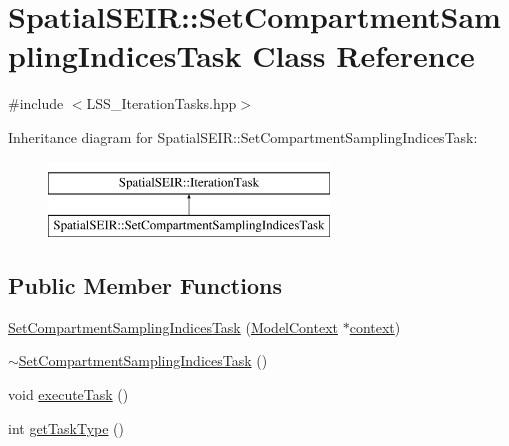 \hypertarget{classSpatialSEIR_1_1SetCompartmentSamplingIndicesTask}{\section{Spatial\-S\-E\-I\-R\-:\-:Set\-Compartment\-Sampling\-Indices\-Task Class Reference}
\label{classSpatialSEIR_1_1SetCompartmentSamplingIndicesTask}
}


{\ttfamily \#include $<$L\-S\-S\-\_\-\-Iteration\-Tasks.\-hpp$>$}

Inheritance diagram for Spatial\-S\-E\-I\-R\-:\-:Set\-Compartment\-Sampling\-Indices\-Task\-:\begin{figure}[H]
\begin{center}
\leavevmode
\includegraphics[height=2.000000cm]{classSpatialSEIR_1_1SetCompartmentSamplingIndicesTask}
\end{center}
\end{figure}
\subsection*{Public Member Functions}
\begin{DoxyCompactItemize}
\item 
\hyperlink{classSpatialSEIR_1_1SetCompartmentSamplingIndicesTask_a2f292054f24192f3b6e9ce7b63fa297b}{Set\-Compartment\-Sampling\-Indices\-Task} (\hyperlink{classSpatialSEIR_1_1ModelContext}{Model\-Context} $\ast$\hyperlink{classSpatialSEIR_1_1SetCompartmentSamplingIndicesTask_a52dd5ee41a16c253719145db4619f21d}{context})
\item 
\hyperlink{classSpatialSEIR_1_1SetCompartmentSamplingIndicesTask_a5d9804f091418dfead47b7bd284ffd29}{$\sim$\-Set\-Compartment\-Sampling\-Indices\-Task} ()
\item 
void \hyperlink{classSpatialSEIR_1_1SetCompartmentSamplingIndicesTask_aebbc3bb4337fe6ce5c2f81335489c4df}{execute\-Task} ()
\item 
int \hyperlink{classSpatialSEIR_1_1SetCompartmentSamplingIndicesTask_ae48bddebfa315cf138729bc90f24abc0}{get\-Task\-Type} ()
\end{DoxyCompactItemize}
